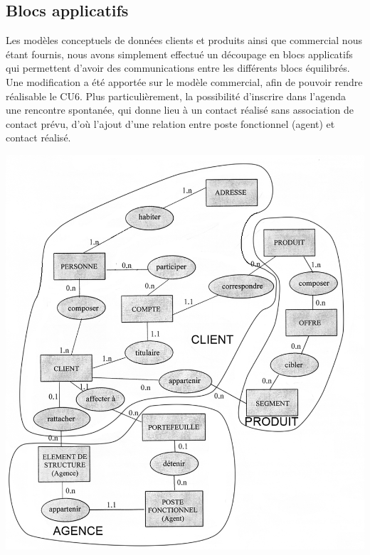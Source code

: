\subsection{Blocs applicatifs}
Les modèles conceptuels de données clients et produits ainsi que commercial nous étant fournis, nous avons simplement effectué un découpage en blocs applicatifs qui permettent d'avoir des communications entre les différents blocs équilibrés.
Une modification a été apportée sur le modèle commercial, afin de pouvoir rendre réalisable le CU6. Plus particulièrement, la possibilité d'inscrire dans l'agenda une rencontre spontanée, qui donne lieu à un contact réalisé sans association de contact prévu, d'où l'ajout d'une relation entre poste fonctionnel (agent) et contact réalisé.
\begin {center}
\includegraphics[width=\textwidth]{Decoupage MCD 1.png}

\end{center}
